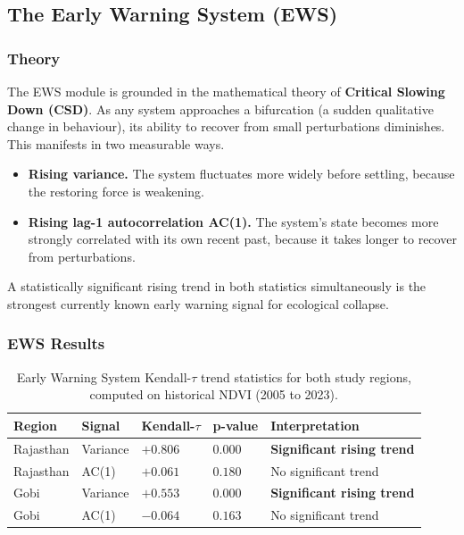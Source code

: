 \documentclass[12pt, a4paper]{article}
\begin{document}
\subsection{The Early Warning System (EWS)}

\subsubsection{Theory}

The EWS module is grounded in the mathematical theory of
\textbf{Critical Slowing Down (CSD)}. As any system approaches a
bifurcation (a sudden qualitative change in behaviour), its ability to
recover from small perturbations diminishes. This manifests in two
measurable ways.

\begin{itemize}
    \item \textbf{Rising variance.} The system fluctuates more widely
    before settling, because the restoring force is weakening.
    \item \textbf{Rising lag-1 autocorrelation AC(1).} The system's state
    becomes more strongly correlated with its own recent past, because it
    takes longer to recover from perturbations.
\end{itemize}

A statistically significant rising trend in both statistics simultaneously
is the strongest currently known early warning signal for ecological
collapse.

\subsubsection{EWS Results}

\begin{table}[H]
\centering
\caption{Early Warning System Kendall-$\tau$ trend statistics for both
study regions, computed on historical NDVI (2005 to 2023).}
\label{tab:ews}
\begin{tabularx}{\textwidth}{p{2.4cm} p{2.2cm} p{2.4cm} p{1.8cm} X}
\toprule
\textbf{Region} & \textbf{Signal} &
\textbf{Kendall-$\tau$} & \textbf{p-value} &
\textbf{Interpretation} \\
\midrule
Rajasthan & Variance  & $+0.806$ & $0.000$ &
    \textcolor{warnred}{\textbf{Significant rising trend}} \\[3pt]
Rajasthan & AC(1)     & $+0.061$ & $0.180$ &
    No significant trend \\[6pt]
Gobi      & Variance  & $+0.553$ & $0.000$ &
    \textcolor{warnred}{\textbf{Significant rising trend}} \\[3pt]
Gobi      & AC(1)     & $-0.064$ & $0.163$ &
    No significant trend \\
\bottomrule
\end{tabularx}
\end{table}
\end{document}
